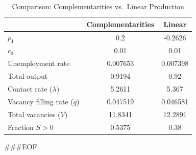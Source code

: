 \begin{table}[htbp]
\centering
\caption{Comparison: Complementarities vs.\ Linear Production}
\begin{tabular}{lcc}
\hline\hline
 & Complementarities & Linear \\
\hline
$p_1$ & 0.2 & -0.2626 \\
$c_0$ & 0.01 & 0.01 \\
Unemployment rate & 0.007653 & 0.007398 \\
Total output & 0.9194 & 0.92 \\
Contact rate ($\lambda$) & 5.2611 & 5.367 \\
Vacancy filling rate ($q$) & 0.047519 & 0.046581 \\
Total vacancies ($V$) & 11.8341 & 12.2891 \\
Fraction $S>0$ & 0.5375 & 0.38 \\
\hline\hline
\end{tabular}
\end{table}
###EOF